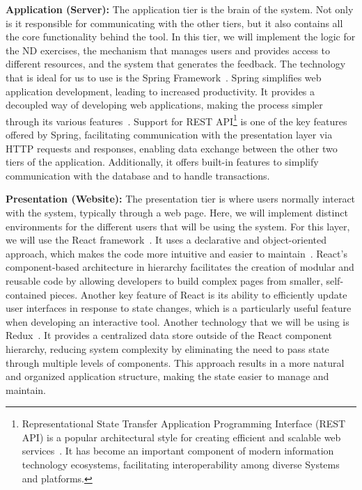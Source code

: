 \textbf{Application (Server):} The application tier is the brain of the system. Not only is it responsible for communicating with the other tiers, but it also contains all the core functionality behind the tool. In this tier, we will implement the logic for the \gls{ND} exercises, the mechanism that manages users and provides access to different resources, and the system that generates the feedback. The technology that is ideal for us to use is the Spring Framework~\cite{spring_2019_spring}. Spring simplifies web application development, leading to increased productivity. It provides a decoupled way of developing web applications, making the process simpler through its various features~\cite{wali_2019_rapid}. Support for REST API\footnote{Representational State Transfer Application Programming Interface (REST API) is a popular architectural style for creating efficient and scalable web services~\cite{daruprasetyawan_2024_pengembangan}. It has become an important component of modern information technology ecosystems, facilitating interoperability among diverse Systems and platforms.} is one of the key features offered by Spring, facilitating communication with the presentation layer via HTTP requests and responses, enabling data exchange between the other two tiers of the application. Additionally, it offers built-in features to simplify communication with the database and to handle transactions.


\textbf{Presentation (Website):} The presentation tier is where users normally interact with the system, typically through a web page. Here, we will implement distinct environments for the different users that will be using the system. For this layer, we will use the React framework~\cite{metaopensource_2024_react}. It uses a declarative and object-oriented approach, which makes the code more intuitive and easier to maintain~\cite{madsen_a}. React's component-based architecture in hierarchy facilitates the creation of modular and reusable code by allowing developers to build complex pages from smaller, self-contained pieces. Another key feature of React is its ability to efficiently update user interfaces in response to state changes, which is a particularly useful feature when developing an interactive tool. Another technology that we will be using is Redux~\cite{freeman_2019_using}. It provides a centralized data store outside of the React component hierarchy, reducing system complexity by eliminating the need to pass state through multiple levels of components. This approach results in a more natural and organized application structure, making the state easier to manage and maintain.


